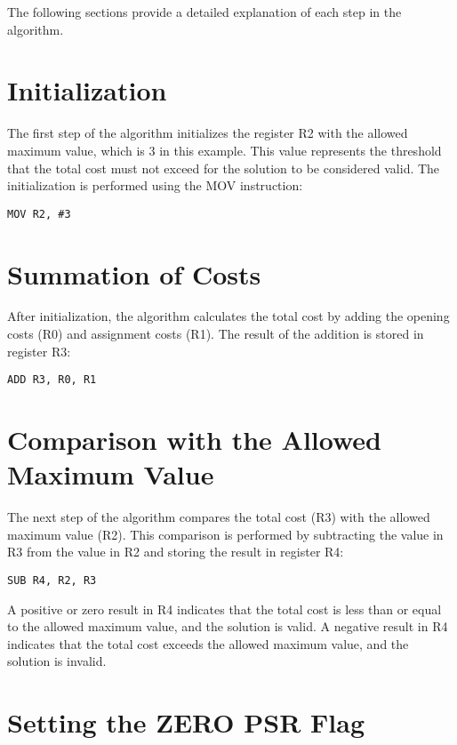 The following sections provide a detailed explanation of each step in the algorithm.

\section{Initialization}

The first step of the algorithm initializes the register R2 with the allowed maximum value, which is 3 in this example. This value represents the threshold that the total cost must not exceed for the solution to be considered valid. The initialization is performed using the MOV instruction:

\begin{verbatim}
MOV R2, #3
\end{verbatim}

\section{Summation of Costs}

After initialization, the algorithm calculates the total cost by adding the opening costs (R0) and assignment costs (R1). The result of the addition is stored in register R3:

\begin{verbatim}
ADD R3, R0, R1
\end{verbatim}

\section{Comparison with the Allowed Maximum Value}

The next step of the algorithm compares the total cost (R3) with the allowed maximum value (R2). This comparison is performed by subtracting the value in R3 from the value in R2 and storing the result in register R4:

\begin{verbatim}
SUB R4, R2, R3
\end{verbatim}

A positive or zero result in R4 indicates that the total cost is less than or equal to the allowed maximum value, and the solution is valid. A negative result in R4 indicates that the total cost exceeds the allowed maximum value, and the solution is invalid.

\section{Setting the ZERO PSR Flag}

